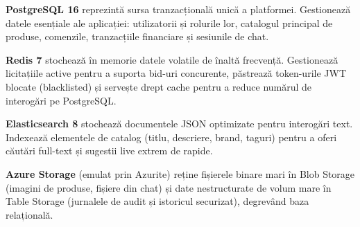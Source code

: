 \textbf{PostgreSQL 16} reprezintă sursa tranzacțională unică a platformei. Gestionează datele esențiale ale aplicației: utilizatorii și rolurile lor, catalogul principal de produse, comenzile, tranzacțiile financiare și sesiunile de chat.

\textbf{Redis 7} stochează în memorie datele volatile de înaltă frecvență. Gestionează licitațiile active pentru a suporta bid-uri concurente, păstrează token-urile JWT blocate (blacklisted) și servește drept cache pentru a reduce numărul de interogări pe PostgreSQL.

\textbf{Elasticsearch 8} stochează documentele JSON optimizate pentru interogări text. Indexează elementele de catalog (titlu, descriere, brand, taguri) pentru a oferi căutări full-text și sugestii live extrem de rapide.

\textbf{Azure Storage} (emulat prin Azurite) reține fișierele binare mari în Blob Storage (imagini de produse, fișiere din chat) și date nestructurate de volum mare în Table Storage (jurnalele de audit și istoricul securizat), degrevând baza relațională.

